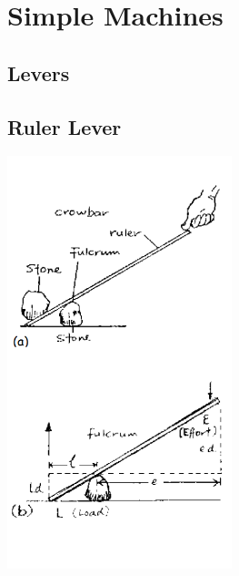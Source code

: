 \section{Simple Machines}


\begin{multicols}{2}


\section*{Levers}


\subsection{Ruler Lever}

\begin{center}
\includegraphics[width=0.49\textwidth]{./img/source/ruler-lever.png}
\end{center}


\end{multicols}
